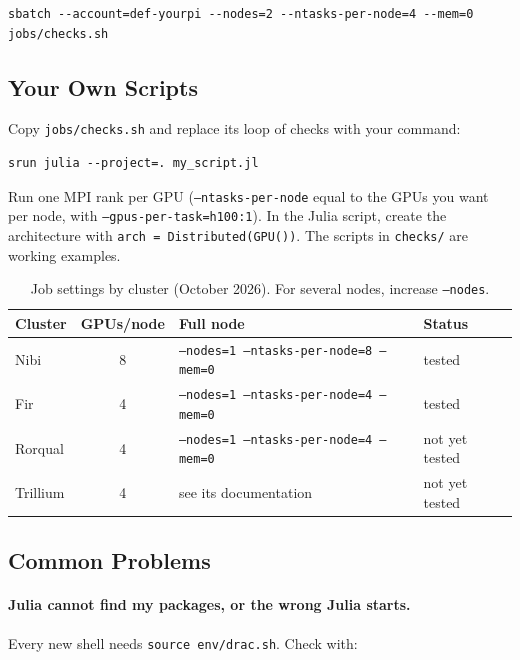 \begin{lstlisting}
sbatch --account=def-yourpi --nodes=2 --ntasks-per-node=4 --mem=0 jobs/checks.sh
\end{lstlisting}

\subsection{Your Own Scripts}

Copy \texttt{jobs/checks.sh} and replace its loop of checks with your command:

\begin{lstlisting}
srun julia --project=. my_script.jl
\end{lstlisting}

Run one MPI rank per GPU (\texttt{--ntasks-per-node} equal to the GPUs you want per node, with
\texttt{--gpus-per-task=h100:1}). In the Julia script, create the architecture with
\texttt{arch = Distributed(GPU())}. The scripts in \texttt{checks/} are working examples.

\begin{table}[h]
\centering\small
\begin{tabular}{@{}lcll@{}}
\toprule
\textbf{Cluster} & \textbf{GPUs/node} & \textbf{Full node} & \textbf{Status} \\
\midrule
Nibi     & 8 & \texttt{--nodes=1 --ntasks-per-node=8 --mem=0} & tested \\
Fir      & 4 & \texttt{--nodes=1 --ntasks-per-node=4 --mem=0} & tested \\
Rorqual  & 4 & \texttt{--nodes=1 --ntasks-per-node=4 --mem=0} & not yet tested \\
Trillium & 4 & see its documentation                          & not yet tested \\
\bottomrule
\end{tabular}
\caption{Job settings by cluster (October 2026). For several nodes, increase \texttt{--nodes}.}
\label{tab:alliance-settings}
\end{table}

\subsection{Common Problems}

\paragraph{Julia cannot find my packages, or the wrong Julia starts.}
Every new shell needs \texttt{source env/drac.sh}. Check with:

